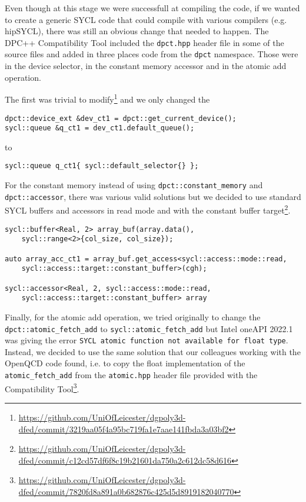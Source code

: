 \documentclass[../main]{subfiles}
\begin{document}
Even though at this stage we were successfull at compiling the code, if we wanted to create a generic SYCL code that could compile with various compilers (e.g. hipSYCL), there was still an obvious change that needed to happen.
The DPC++ Compatibility Tool included the \texttt{dpct.hpp} header file in some of the source files and added in three places code from the \texttt{dpct} namespace.
Those were in the device selector, in the constant memory accessor and in the atomic add operation.

The first was trivial to modify\footnote{\url{https://github.com/UniOfLeicester/dgpoly3d-dfed/commit/3219aa05f4a95bc719fa1e7aae141fbda3a03bf2}} and we only changed the
\begin{verbatim}
dpct::device_ext &dev_ct1 = dpct::get_current_device();
sycl::queue &q_ct1 = dev_ct1.default_queue();
\end{verbatim}
to
\begin{verbatim}
sycl::queue q_ct1{ sycl::default_selector{} };
\end{verbatim}

For the constant memory instead of using \texttt{dpct::constant\_memory} and \texttt{dpct::accessor}, there was various valid solutions but we decided to use standard SYCL buffers and accessors in read mode and with the constant buffer target\footnote{\url{https://github.com/UniOfLeicester/dgpoly3d-dfed/commit/c12cd57df6f8c19b21601da750a2c612dc58d616}}.
\begin{verbatim}
sycl::buffer<Real, 2> array_buf(array.data(),
    sycl::range<2>{col_size, col_size});

auto array_acc_ct1 = array_buf.get_access<sycl::access::mode::read,
    sycl::access::target::constant_buffer>(cgh);

sycl::accessor<Real, 2, sycl::access::mode::read,
    sycl::access::target::constant_buffer> array
\end{verbatim}

Finally, for the atomic add operation, we tried originally to change the \texttt{dpct::atomic\_fetch\_add} to \texttt{sycl::atomic\_fetch\_add} but Intel oneAPI 2022.1 was giving the error \texttt{SYCL atomic function not available for float type}.
Instead, we decided to use the same solution that our colleagues working with the OpenQCD code found, i.e. to copy the float implementation of the \texttt{atomic\_fetch\_add} from the \texttt{atomic.hpp} header file provided with the Compatibility Tool\footnote{\url{https://github.com/UniOfLeicester/dgpoly3d-dfed/commit/7820fd8a891a0b682876c425d5d8919182040770}}.
\end{document}

